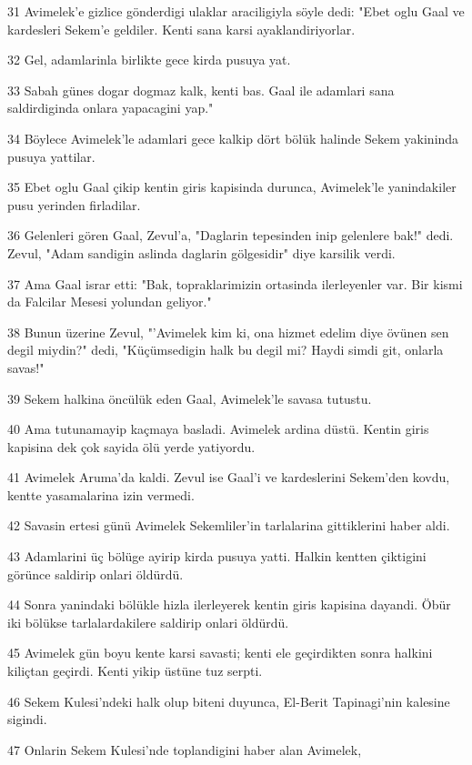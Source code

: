 \par 31 Avimelek'e gizlice gönderdigi ulaklar araciligiyla söyle dedi: "Ebet oglu Gaal ve kardesleri Sekem'e geldiler. Kenti sana karsi ayaklandiriyorlar.
\par 32 Gel, adamlarinla birlikte gece kirda pusuya yat.
\par 33 Sabah günes dogar dogmaz kalk, kenti bas. Gaal ile adamlari sana saldirdiginda onlara yapacagini yap."
\par 34 Böylece Avimelek'le adamlari gece kalkip dört bölük halinde Sekem yakininda pusuya yattilar.
\par 35 Ebet oglu Gaal çikip kentin giris kapisinda durunca, Avimelek'le yanindakiler pusu yerinden firladilar.
\par 36 Gelenleri gören Gaal, Zevul'a, "Daglarin tepesinden inip gelenlere bak!" dedi. Zevul, "Adam sandigin aslinda daglarin gölgesidir" diye karsilik verdi.
\par 37 Ama Gaal israr etti: "Bak, topraklarimizin ortasinda ilerleyenler var. Bir kismi da Falcilar Mesesi yolundan geliyor."
\par 38 Bunun üzerine Zevul, "'Avimelek kim ki, ona hizmet edelim diye övünen sen degil miydin?" dedi, "Küçümsedigin halk bu degil mi? Haydi simdi git, onlarla savas!"
\par 39 Sekem halkina öncülük eden Gaal, Avimelek'le savasa tutustu.
\par 40 Ama tutunamayip kaçmaya basladi. Avimelek ardina düstü. Kentin giris kapisina dek çok sayida ölü yerde yatiyordu.
\par 41 Avimelek Aruma'da kaldi. Zevul ise Gaal'i ve kardeslerini Sekem'den kovdu, kentte yasamalarina izin vermedi.
\par 42 Savasin ertesi günü Avimelek Sekemliler'in tarlalarina gittiklerini haber aldi.
\par 43 Adamlarini üç bölüge ayirip kirda pusuya yatti. Halkin kentten çiktigini görünce saldirip onlari öldürdü.
\par 44 Sonra yanindaki bölükle hizla ilerleyerek kentin giris kapisina dayandi. Öbür iki bölükse tarlalardakilere saldirip onlari öldürdü.
\par 45 Avimelek gün boyu kente karsi savasti; kenti ele geçirdikten sonra halkini kiliçtan geçirdi. Kenti yikip üstüne tuz serpti.
\par 46 Sekem Kulesi'ndeki halk olup biteni duyunca, El-Berit Tapinagi'nin kalesine sigindi.
\par 47 Onlarin Sekem Kulesi'nde toplandigini haber alan Avimelek,
